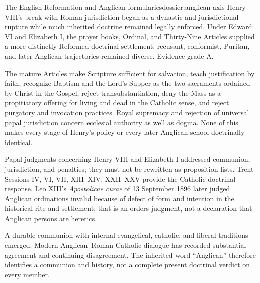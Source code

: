 \begin{heresydossier}{The English Reformation and Anglican formularies}{dossier:anglican-axis}
\objectfield Henry VIII's break with Roman jurisdiction began as a dynastic and jurisdictional rupture while much inherited doctrine remained legally enforced. Under Edward VI and Elizabeth I, the prayer books, Ordinal, and Thirty-Nine Articles supplied a more distinctly Reformed doctrinal settlement; recusant, conformist, Puritan, and later Anglican trajectories remained diverse. Evidence grade A.

\propositionfield The mature Articles make Scripture sufficient for salvation, teach justification by faith, recognize Baptism and the Lord's Supper as the two sacraments ordained by Christ in the Gospel, reject transubstantiation, deny the Mass as a propitiatory offering for living and dead in the Catholic sense, and reject purgatory and invocation practices. Royal supremacy and rejection of universal papal jurisdiction concern ecclesial authority as well as dogma. None of this makes every stage of Henry's policy or every later Anglican school doctrinally identical.

\responsefield Papal judgments concerning Henry VIII and Elizabeth I addressed communion, jurisdiction, and penalties; they must not be rewritten as proposition lists. Trent Sessions IV, VI, VII, XIII--XIV, XXII--XXV provide the Catholic doctrinal response. Leo XIII's \emph{Apostolicae curae} of 13 September 1896 later judged Anglican ordinations invalid because of defect of form and intention in the historical rite and settlement; that is an orders judgment, not a declaration that Anglican persons are heretics.

\aftermathfield A durable communion with internal evangelical, catholic, and liberal traditions emerged. Modern Anglican--Roman Catholic dialogue has recorded substantial agreement and continuing disagreement. The inherited word ``Anglican'' therefore identifies a communion and history, not a complete present doctrinal verdict on every member.
\end{heresydossier}

